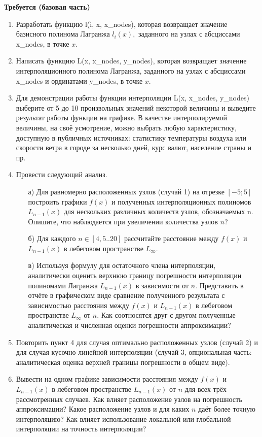 \textbf{Требуется (базовая часть)}
\begin{enumerate}
    \item Разработать функцию l(i, x, x\_nodes), которая возвращает значение базисного полинома Лагранжа $l_i(x),$ заданного на узлах с абсциссами x\_nodes, в точке $x$.
    \item Написать функцию L(x, x\_nodes, y\_nodes), которая возвращает значение интерполяционного полинома Лагранжа, заданного на узлах с абсциссами x\_nodes и ординатами y\_nodes, в точке $x$.
    \item Для демонстрации работы функции интерполяции L(x, x\_nodes, y\_nodes) выберите от 5 до 10 произвольных значений некоторой величины и выведите результат работы функции на графике. В качестве интерполируемой величины, на своё усмотрение, можно выбрать любую характеристику, доступную в публичных источниках: статистику температуры воздуха или скорости ветра в городе за несколько дней, курс валют, население страны и пр.
    \item Провести следующий анализ.
    \begin{enumerate}
        \item [а)] Для равномерно расположенных узлов (случай 1) на отрезке $[−5; 5]$ построить графики $f(x)$ и полученных интерполяционных полиномов $L_{n−1}(x)$ для нескольких различных количеств узлов, обозначаемых n. Опишите, что наблюдается при увеличении количества узлов $n$?
        \item [б)] Для каждого $n \in [4, 5. . 20]$ рассчитайте расстояние между $f(x)$ и $L_{n−1}(x)$ в лебеговом пространстве $L_{\infty}$.
        \item [в)] Используя формулу для остаточного члена интерполяции, аналитически оценить верхнюю границу погрешности интерполяции полиномами Лагранжа $L_{n−1}(x)$ в зависимости от $n$. Представить в отчёте в графическом виде сравнение полученного результата с зависимостью расстояния между $f(x)$ и $L_{n−1}(x)$ в лебеговом пространстве $L_{\infty}$ от $n$. Как соотносятся друг с другом полученные аналитическая и численная оценки погрешности аппроксимации?
    \end{enumerate}
    \item Повторить пункт 4 для случая оптимально расположенных узлов (случай 2) и для случая кусочно-линейной интерполяции (случай 3, опциональная часть: аналитическая оценка верхней границы погрешности в общем виде).
    \item Вывести на одном графике зависимости расстояния между $f(x)$ и $L_{n−1}(x)$ в лебеговом пространстве $L_{n−1}(x)$ от $n$ для всех трёх рассмотренных случаев. Как влияет расположение узлов на погрешность аппроксимации? Какое расположение узлов и для каких $n$ даёт более точную интерполяцию? Как влияет использование локальной или глобальной интерполяции на точность интерполяции?
\end{enumerate}

